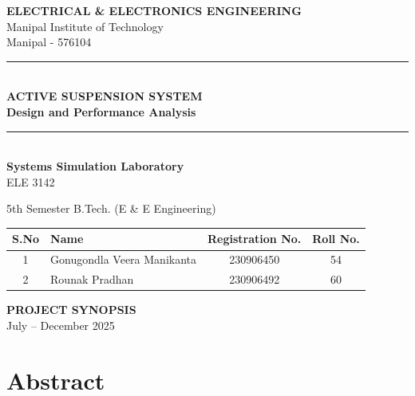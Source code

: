 \documentclass[12pt,a4paper]{article}
\begin{document}
\begin{titlepage}
    \centering
    \vspace*{1cm}
    
    
    {\LARGE\bfseries ELECTRICAL \& ELECTRONICS ENGINEERING\\[0.3cm]}
    {\Large Manipal Institute of Technology\\[0.5cm]}
    {\large Manipal - 576104\\[1cm]}
    
    \rule{\linewidth}{0.5mm}\\[0.4cm]
    {\huge\bfseries ACTIVE SUSPENSION SYSTEM\\[0.2cm]
    Design and Performance Analysis\\[0.4cm]}
    \rule{\linewidth}{0.5mm}\\[1.5cm]
    
    {\Large\textbf{Systems Simulation Laboratory}\\[0.2cm]
    ELE 3142\\[0.5cm]}
    
    {\large 5th Semester B.Tech. (E \& E Engineering)\\[1.5cm]}
    
    \begin{table}[H]
    \centering
    \begin{tabular}{|c|l|c|c|}
    \hline
    \textbf{S.No} & \textbf{Name} & \textbf{Registration No.} & \textbf{Roll No.} \\ \hline
    1 & Gonugondla Veera Manikanta & 230906450 & 54 \\ \hline
    2 & Rounak Pradhan & 230906492 & 60 \\ \hline
    \end{tabular}
    \end{table}
    
    \vfill
    
    {\large\bfseries PROJECT SYNOPSIS}\\[0.5cm]
    {\large July -- December 2025}
    
\end{titlepage}

\newpage
\section*{Abstract}
\end{document}

